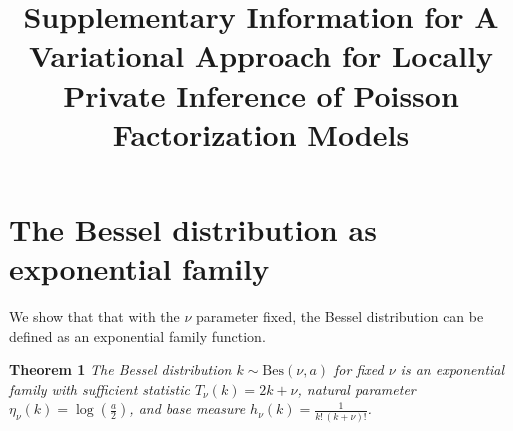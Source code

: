 \documentclass{article}
\title{Supplementary Information for A Variational Approach for Locally Private Inference of Poisson Factorization Models}
\author{} %
\newcommand{\teq}{\!=\!}
\newcommand{\tp}{\!+\!}
\begin{document}
\maketitle

\section{The Bessel distribution as exponential family}
  \label{sec:expfambessel}
  
  We show that that with the $\nu$ parameter fixed, the Bessel distribution can be defined as an exponential family function.
  
  \textbf{Theorem 1}
    \label{theorem:expfam}
    \textit{The Bessel distribution $k \!\sim\!\textrm{Bes}(\nu, a)$ for fixed
   $\nu$ is an exponential family with sufficient statistic $T_\nu(k) \teq 2k
   \tp \nu$, natural parameter $\eta_\nu(k) \teq \log\left(\frac{a}{2}\right)$,
   and base measure $h_\nu(k) \teq \frac{1}{k!\,(k+\nu)!}$.}
\end{document}
